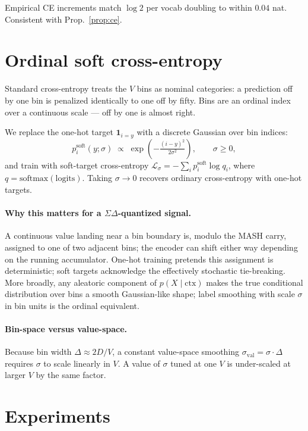 \documentclass[11pt]{article}
\theoremstyle{remark}
\begin{document}
Empirical CE increments match $\log 2$ per vocab doubling to within
$0.04$ nat. Consistent with Prop.~\ref{prop:ce}.

\section{Ordinal soft cross-entropy}
\label{sec:loss}

Standard cross-entropy treats the $V$ bins as nominal categories: a
prediction off by one bin is penalized identically to one off by
fifty. Bins are an ordinal index over a continuous scale --- off by one
is almost right.

We replace the one-hot target $\mathbf 1_{i = y}$ with a discrete
Gaussian over bin indices:
\begin{equation}
p^{\text{soft}}_i(y; \sigma) \;\propto\; \exp\!\left(-\tfrac{(i - y)^2}{2\sigma^2}\right),
\qquad \sigma \ge 0,
\end{equation}
and train with soft-target cross-entropy $\mathcal L_\sigma = -\sum_i
p^{\text{soft}}_i \log q_i$, where $q = \mathrm{softmax}(\text{logits})$.
Taking $\sigma \to 0$ recovers ordinary cross-entropy with one-hot
targets.

\paragraph{Why this matters for a $\Sigma\Delta$-quantized signal.}
A continuous value landing near a bin boundary is, modulo the MASH
carry, assigned to one of two adjacent bins; the encoder can shift
either way depending on the running accumulator. One-hot training
pretends this assignment is deterministic; soft targets acknowledge
the effectively stochastic tie-breaking. More broadly, any aleatoric
component of $p(X \mid \mathrm{ctx})$ makes the true conditional
distribution over bins a smooth Gaussian-like shape; label smoothing
with scale $\sigma$ in bin units is the ordinal equivalent.

\paragraph{Bin-space versus value-space.}
Because bin width $\Delta \approx 2D/V$, a constant value-space
smoothing $\sigma_{\text{val}} = \sigma \cdot \Delta$ requires $\sigma$
to scale linearly in $V$. A value of $\sigma$ tuned at one $V$ is
under-scaled at larger $V$ by the same factor.

\section{Experiments}
\label{sec:experiments}
\end{document}
